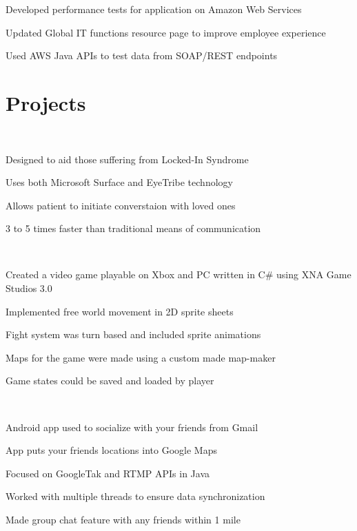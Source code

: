 \documentclass[]{deedy-resume-openfont}
\begin{document}
\begin{minipage}[t]{0.66\textwidth}
\begin{tightemize}
\item Developed performance tests for application on Amazon Web Services
\item Updated Global IT functions resource page to improve employee experience
\item Used AWS Java APIs to test data from SOAP/REST endpoints
\end{tightemize}
\sectionsep


\section{Projects}
 \\
\begin{tightemize}
\item Designed to aid those suffering from Locked-In Syndrome
\item Uses both Microsoft Surface and EyeTribe technology
\item Allows patient to initiate converstaion with loved ones
\item 3 to 5 times faster than traditional means of communication
\end{tightemize}
\sectionsep

 \\
\begin{tightemize}
\item Created a video game playable on Xbox and PC written in C\# using XNA Game Studios 3.0
\item Implemented free world movement in 2D sprite sheets
\item Fight system was turn based and included sprite animations
\item Maps for the game were made using a custom made map-maker
\item Game states could be saved and loaded by player
\end{tightemize}
\sectionsep

 \\
\begin{tightemize}
\item Android app used to socialize with your friends from Gmail
\item App puts your friends locations into Google Maps
\item Focused on GoogleTak and RTMP APIs in Java
\item Worked with multiple threads to ensure data synchronization
\item Made group chat feature with any friends within 1 mile
\end{tightemize}
\sectionsep


\end{minipage}
\end{document}
